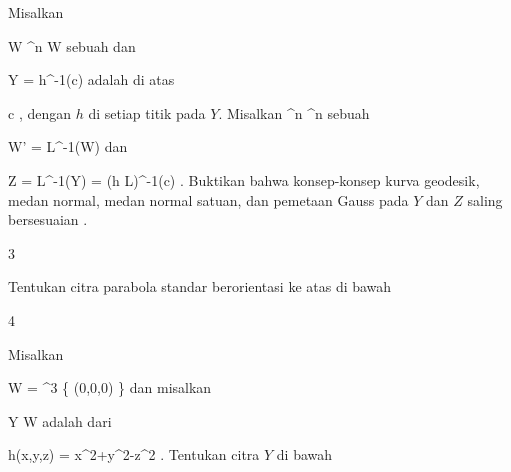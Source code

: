 {}
{

Misalkan

\mavergleichskette
{\vergleichskette
{ W
}
{ \subseteq }{ \R^n
}
{  }{
}
{    }{
}
{   }{
}
}
{}{}{}
 { W } { \R
} {}
sebuah
dan

\mavergleichskette
{\vergleichskette
{ Y
}
{ = }{ h^{-1}(c)
}
{  }{
}
{    }{
}
{   }{
}
}
{}{}{}
adalah
di atas

\mavergleichskette
{\vergleichskette
{ c
}
{ \in }{ \R
}
{  }{
}
{    }{
}
{   }{
}
}
{}{}{,}
dengan $h$
di setiap titik pada $Y$. Misalkan
 {\R^n } { \R^n
} {}
sebuah

\mavergleichskette
{\vergleichskette
{ W'
}
{ = }{ L^{-1}(W)
}
{  }{
}
{    }{
}
{   }{
}
}
{}{}{}
dan

\mavergleichskettedisp
{\vergleichskette
{ Z
}
{ =} { L^{-1}(Y)
}
{ =} { (h \circ L)^{-1}(c)
}
{ } {
}
{ } {
}
}
{}{}{.}
Buktikan bahwa konsep-konsep kurva geodesik, medan normal, medan normal satuan, dan pemetaan Gauss pada $Y$ dan $Z$ saling bersesuaian
 {} {.}

}
{} {}


{3}
{

Tentukan citra parabola standar berorientasi ke atas di bawah

}
{} {}

{4}
{

Misalkan

\mavergleichskette
{\vergleichskette
{ W
}
{ = }{ \R^3 \setminus \{ (0,0,0) \}
}
{  }{
}
{    }{
}
{   }{
}
}
{}{}{}
dan misalkan

\mavergleichskette
{\vergleichskette
{ Y
}
{ \subseteq }{ W
}
{  }{
}
{    }{
}
{   }{
}
}
{}{}{}
adalah
dari

\mavergleichskettedisp
{\vergleichskette
{ h(x,y,z)
}
{ =} { x^2+y^2-z^2
}
{ } {
}
{ } {
}
{ } {
}
}
{}{}{.}
Tentukan citra $Y$
 {} {}
di bawah

}
{} {}

